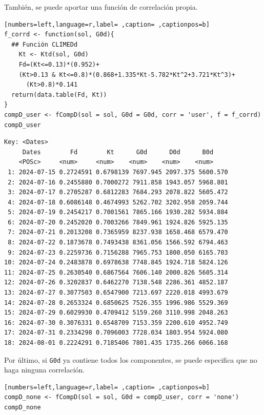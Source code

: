 \begin{itemize}
También, se puede aportar una función de correlación propia.
\begin{lstlisting}[numbers=left,language=r,label= ,caption= ,captionpos=b]
f_corrd <- function(sol, G0d){
  ## Función CLIMEDd
    Kt <- Ktd(sol, G0d)
    Fd=(Kt<=0.13)*(0.952)+
    (Kt>0.13 & Kt<=0.8)*(0.868+1.335*Kt-5.782*Kt^2+3.721*Kt^3)+
      (Kt>0.8)*0.141
  return(data.table(Fd, Kt))
}
compD_user <- fCompD(sol = sol, G0d = G0d, corr = 'user', f = f_corrd)
compD_user
\end{lstlisting}

\begin{verbatim}
Key: <Dates>
	 Dates        Fd        Kt      G0d      D0d      B0d
	<POSc>     <num>     <num>    <num>    <num>    <num>
 1: 2024-07-15 0.2724591 0.6798139 7697.945 2097.375 5600.570
 2: 2024-07-16 0.2455880 0.7000272 7911.858 1943.057 5968.801
 3: 2024-07-17 0.2705287 0.6812283 7684.293 2078.822 5605.472
 4: 2024-07-18 0.6086148 0.4674993 5262.702 3202.958 2059.744
 5: 2024-07-19 0.2454217 0.7001561 7865.166 1930.282 5934.884
 6: 2024-07-20 0.2452020 0.7003266 7849.961 1924.826 5925.135
 7: 2024-07-21 0.2013208 0.7365959 8237.938 1658.468 6579.470
 8: 2024-07-22 0.1873678 0.7493438 8361.056 1566.592 6794.463
 9: 2024-07-23 0.2259736 0.7156288 7965.753 1800.050 6165.703
10: 2024-07-24 0.2483878 0.6978638 7748.845 1924.718 5824.126
11: 2024-07-25 0.2630540 0.6867564 7606.140 2000.826 5605.314
12: 2024-07-26 0.3202837 0.6462270 7138.548 2286.361 4852.187
13: 2024-07-27 0.3077503 0.6547900 7213.697 2220.018 4993.679
14: 2024-07-28 0.2653324 0.6850625 7526.355 1996.986 5529.369
15: 2024-07-29 0.6029930 0.4709412 5159.260 3110.998 2048.263
16: 2024-07-30 0.3076331 0.6548709 7153.359 2200.610 4952.749
17: 2024-07-31 0.2334298 0.7096003 7728.034 1803.954 5924.080
18: 2024-08-01 0.2224291 0.7185406 7801.435 1735.266 6066.168
\end{verbatim}

Por último, si \texttt{G0d} ya contiene todos los componentes, se puede especifica que no haga ninguna correlación.
\begin{lstlisting}[numbers=left,language=r,label= ,caption= ,captionpos=b]
compD_none <- fCompD(sol = sol, G0d = compD_user, corr = 'none')
compD_none
\end{lstlisting}


\end{itemize}
